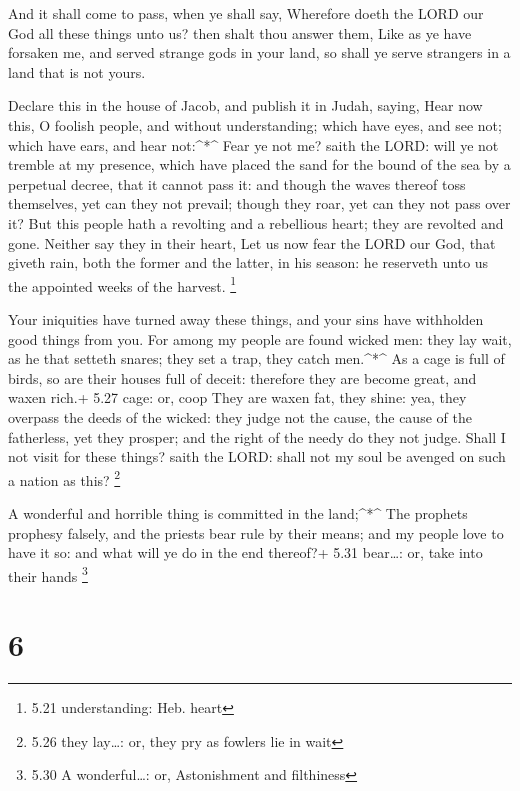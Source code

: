  And it shall come to pass, when ye shall say, Wherefore
doeth the LORD our God all these things unto us? then shalt thou answer
them, Like as ye have forsaken me, and served strange gods in your land,
so shall ye serve strangers in a land that is not yours.

 Declare this in the house of Jacob, and publish it in
Judah, saying,  Hear now this, O foolish people, and
without understanding; which have eyes, and see not; which have ears,
and hear not:\^{}*\^{}  Fear ye not me? saith the LORD:
will ye not tremble at my presence, which have placed the sand for the
bound of the sea by a perpetual decree, that it cannot pass it: and
though the waves thereof toss themselves, yet can they not prevail;
though they roar, yet can they not pass over it?  But this
people hath a revolting and a rebellious heart; they are revolted and
gone.  Neither say they in their heart, Let us now fear the
LORD our God, that giveth rain, both the former and the latter, in his
season: he reserveth unto us the appointed weeks of the harvest.
\footnote{5.21 understanding: Heb. heart}

 Your iniquities have turned away these things, and your
sins have withholden good things from you.  For among my
people are found wicked men: they lay wait, as he that setteth snares;
they set a trap, they catch men.\^{}*\^{}  As a cage is
full of birds, so are their houses full of deceit: therefore they are
become great, and waxen rich.+ 5.27 cage: or, coop  They
are waxen fat, they shine: yea, they overpass the deeds of the wicked:
they judge not the cause, the cause of the fatherless, yet they prosper;
and the right of the needy do they not judge.  Shall I not
visit for these things? saith the LORD: shall not my soul be avenged on
such a nation as this? \footnote{5.26 they lay\ldots: or, they pry as
  fowlers lie in wait}

 A wonderful and horrible thing is committed in the
land;\^{}*\^{}  The prophets prophesy falsely, and the
priests bear rule by their means; and my people love to have it so: and
what will ye do in the end thereof?+ 5.31 bear\ldots: or, take into
their hands \footnote{5.30 A wonderful\ldots: or, Astonishment and
  filthiness}

\hypertarget{section-5}{%
\section{6}\label{section-5}}

